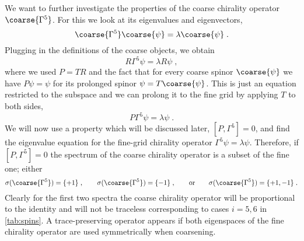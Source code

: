We want to further investigate the properties of the coarse chirality operator $\coarse{\Gamma^{5}}$.
For this we look at its eigenvalues and eigenvectors,
\begin{equation}
\coarse{\Gamma^{5}} \coarse{\psi} = \lambda \coarse{\psi} \;.
\end{equation}
Plugging in the definitions of the coarse objects, we obtain
\begin{equation}
R \Gamma^{5} \psi = \lambda R \psi \;,
\end{equation}
where we used $P = TR$ and the fact that for every coarse spinor $\coarse{\psi}$ we have $P \psi = \psi$ for its prolonged spinor $\psi = T \coarse{\psi}$.
This is just an equation restricted to the subspace and we can prolong it to the fine grid by applying $T$ to both sides,
\begin{equation}
P \Gamma^{5} \psi = \lambda \psi \;.
\end{equation}
We will now use a property which will be discussed later, $[P, \Gamma^{5}] = 0$, and find the eigenvalue equation for the fine-grid chirality operator $\Gamma^{5} \psi = \lambda \psi$.
Therefore, if $[P, \Gamma^{5}] = 0$ the spectrum of the coarse chirality operator is a subset of the fine one; either
\begin{equation} \label{eq:sigma}
\sigma(\coarse{\Gamma^{5}}) = \{+1\} \;,
\qquad
\sigma(\coarse{\Gamma^{5}}) = \{-1\} \;,
\qquad
\text{or}
\qquad
\sigma(\coarse{\Gamma^{5}}) = \{+1, -1\} \;.
\end{equation}
Clearly for the first two spectra the coarse chirality operator will be proportional to the identity and will not be traceless corresponding to cases $i=5,6$ in \cref{tab:spins}.
A trace-preserving operator appears if both eigenspaces of the fine chirality operator are used symmetrically when coarsening.


